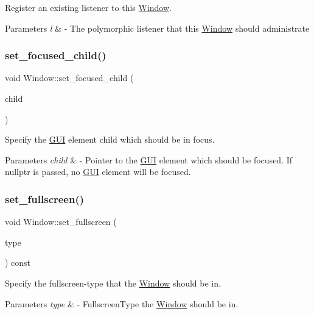 Register an existing listener to this \mbox{\hyperlink{class_window}{Window}}. 
\begin{DoxyParams}{Parameters}
{\em l} & -\/ The polymorphic listener that this \mbox{\hyperlink{class_window}{Window}} should administrate \\
\hline
\end{DoxyParams}
\mbox{\label{class_window_abed0ae68fac68c8d2191d4c7d7a82497}} 
\subsubsection{\texorpdfstring{set\+\_\+focused\+\_\+child()}{set\_focused\_child()}}
{\footnotesize\ttfamily void Window\+::set\+\_\+focused\+\_\+child (\begin{DoxyParamCaption}\item[{\mbox{\hyperlink{class_g_u_i}{G\+UI}} $\ast$}]{child }\end{DoxyParamCaption})}

Specify the \mbox{\hyperlink{class_g_u_i}{G\+UI}} element child which should be in focus. 
\begin{DoxyParams}{Parameters}
{\em child} & -\/ Pointer to the \mbox{\hyperlink{class_g_u_i}{G\+UI}} element which should be focused. If nullptr is passed, no \mbox{\hyperlink{class_g_u_i}{G\+UI}} element will be focused. \\
\hline
\end{DoxyParams}
\mbox{\label{class_window_ae2ed6e396cf3dd2eb2636951192949cf}} 
\subsubsection{\texorpdfstring{set\+\_\+fullscreen()}{set\_fullscreen()}}
{\footnotesize\ttfamily void Window\+::set\+\_\+fullscreen (\begin{DoxyParamCaption}\item[{Window\+::\+Fullscreen\+Type}]{type }\end{DoxyParamCaption}) const}

Specify the fullscreen-\/type that the \mbox{\hyperlink{class_window}{Window}} should be in. 
\begin{DoxyParams}{Parameters}
{\em type} & -\/ Fullscreen\+Type the \mbox{\hyperlink{class_window}{Window}} should be in. \\
\hline
\end{DoxyParams}
\mbox{\label{class_window_ae70c9e2fddb5224f884291b6d8225fe4}} 
